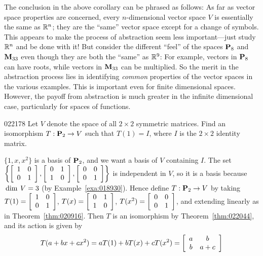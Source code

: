 The conclusion in the above corollary can be phrased as follows: As far as vector space properties are concerned, every $n$-dimensional vector space $V$ is essentially the same as $\mathbb{R}^n$; they are the ``same'' vector space except for a change of symbols. This appears to make the process of abstraction seem less important---just study $\mathbb{R}^n$ and be done with it! But consider the different ``feel'' of the spaces $\textbf{P}_{8}$ and $\textbf{M}_{33}$ even though they are both the ``same'' as $\mathbb{R}^9$: For example, vectors in $\textbf{P}_{8}$ can have roots, while vectors in $\textbf{M}_{33}$ can be multiplied. So the merit in the abstraction process lies in identifying \textit{common} properties of the vector spaces in the various examples. This is important even for finite dimensional spaces. However, the payoff from abstraction is much greater in the infinite dimensional case, particularly for spaces of functions.


\begin{example}{}{022178}
Let $V$ denote the space of all $2 \times 2$ symmetric matrices. Find an isomorphism $T : \textbf{P}_{2} \to V$ such that $T(1) = I$, where $I$ is the $2 \times 2$ identity matrix.


\begin{solution}
  $\{1, x, x^{2}\}$ is a basis of $\textbf{P}_{2}$, and we want a basis of $V$ containing $I$. The set $\left\lbrace \left[ \begin{array}{cc}
  	1 & 0 \\
  	0 & 1
  \end{array} \right], \left[ \begin{array}{cc}
  0 & 1 \\
  1 & 0
  \end{array} \right], \left[ \begin{array}{cc}
  0 & 0 \\
  0 & 1
  \end{array} \right] \right\rbrace$
 is independent in $V$, so it is a basis because $\thinspace\operatorname{dim \medspace}V = 3$ (by Example~\ref{exa:018930}). Hence define $T : \textbf{P}_{2} \to V$ by taking $T(1) = \left[ \begin{array}{cc}
 1 & 0 \\
 0 & 1
 \end{array} \right]$, $T(x) = \left[ \begin{array}{cc}
 0 & 1 \\
 1 & 0
 \end{array} \right]$, $T(x^2) = \left[ \begin{array}{cc}
 0 & 0 \\
 0 & 1
 \end{array} \right]$, and extending linearly as in Theorem~\ref{thm:020916}. Then $T$ is an isomorphism by Theorem~\ref{thm:022044}, and its action is given by\begin{equation*} 
T(a + bx + cx^2) = aT(1) + bT(x) + cT(x^2) = \left[ \begin{array}{cc}
 a & b \\
 b & a + c
 \end{array} \right]
\end{equation*}
\end{solution}
\end{example}

